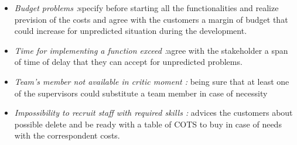 \begin{itemize}
	\item \emph{Budget problems :}specify before starting all the functionalities and realize prevision of the costs and agree with the customers a margin of budget that could increase for unpredicted situation during the development.
	
	\item \emph{Time for implementing a function exceed :}agree with the stakeholder a span of time of delay that they can accept for unpredicted problems.
	
	\item \emph{Team’s member not available in critic moment :} being sure that at least one of the supervisors could substitute a team member in case of necessity
	
	\item \emph{Impossibility to recruit staff with required skills :} advices the customers about possible delete and be ready with a table of COTS to buy in case of needs with the correspondent costs.
	
\end{itemize}